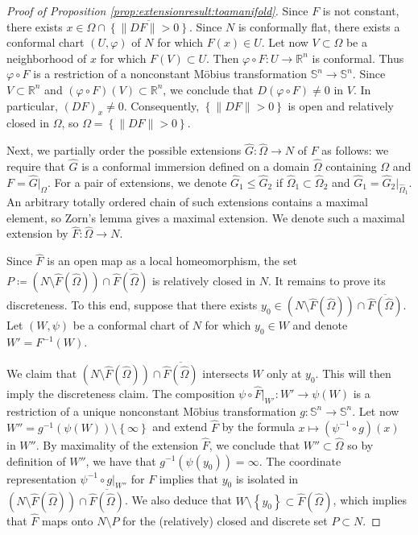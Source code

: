 \documentclass[a4paper,leqno,11pt]{amsart}
\numberwithin{equation}{section}
\theoremstyle{remark}
\theoremstyle{remark}
\newcommand{\R}{\mathbb{R}}
\newcommand{\bS}{\mathbb{S}}
\begin{document}
\begin{proof}[Proof of Proposition \ref{prop:extensionresult:toamanifold}]
Since $F$ is not constant, there exists $x \in \Omega \cap \overline{ \left\{ \|DF\| > 0 \right\} }$. Since $N$ is conformally flat, there exists a conformal chart $(U,\varphi)$ of $N$ for which $F(x)\in U$. Let now $V\subset \Omega$ be a neighborhood of $x$ for which $F(V) \subset U$. Then $\varphi \circ F \colon U \to \R^n$ is conformal. Thus $\varphi \circ F$ is a restriction of a nonconstant M\"obius transformation $\bS^n \to \bS^n$. Since $V \subset \R^n$ and $(\varphi \circ F)(V) \subset \R^n$, we conclude that $D(\varphi \circ F) \ne 0$ in $V$. In particular, $( DF )_x\ne 0$. Consequently, $\left\{ \|DF\| > 0 \right\}$ is open and relatively closed in $\Omega$, so $\Omega = \left\{ \|DF\| > 0 \right\}$.

Next, we partially order the possible extensions $\widehat{G} \colon \widehat{\Omega} \to N$ of $F$ as follows: we require that $\widehat{G}$ is a conformal immersion defined on a domain $\widehat{\Omega}$ containing $\Omega$ and $F= \widehat{G}|_{\Omega}$. For a pair of extensions, we denote $\widehat{G}_1 \leq \widehat{G}_2$ if $\widehat{\Omega}_1 \subset \widehat{\Omega}_2$ and $\widehat{G}_1 = \widehat{G}_2|_{ \widehat{\Omega}_1 }$. An arbitrary totally ordered chain of such extensions contains a maximal element, so Zorn's lemma gives a maximal extension. We denote such a maximal extension by $\widehat{F} \colon \widehat{\Omega} \to N$.

Since $\widehat{F}$ is an open map as a local homeomorphism, the set $P \coloneqq (N\setminus \widehat{F}( \widehat{\Omega}) ) \cap \overline{ \widehat{F}( \widehat{\Omega} ) }$ is relatively closed in $N$. It remains to prove its discreteness. To this end, suppose that there exists $y_0 \in (N\setminus \widehat{F}( \widehat{\Omega}) ) \cap \overline{ \widehat{F}( \widehat{\Omega} ) }$. Let $(W,\psi)$ be a conformal chart of $N$ for which $y_0 \in W$ and denote $W' = F^{-1}( W )$.

We claim that $(N\setminus \widehat{F}( \widehat{\Omega}) ) \cap \overline{ \widehat{F}( \widehat{\Omega} ) }$ intersects $W$ only at $y_0$. This will then imply the discreteness claim. The composition $\psi \circ \widehat{F}|_{W'} \colon W' \to \psi (W)$ is a restriction of a unique nonconstant M\"obius transformation $g\colon \bS^n \to \bS^n$. Let now $W'' = g^{-1}\left( \psi(W) \right) \setminus \left\{ \infty \right\}$ and extend $\widehat{F}$ by the formula $x\mapsto (\psi^{-1} \circ g)(x)$ in $W''$. By maximality of the extension $\widehat{F}$, we conclude that $W'' \subset \widehat{\Omega}$ so by definition of $W''$, we have that $g^{-1}( \psi(y_0) ) = \infty$. The coordinate representation $\psi^{-1} \circ g|_{ W''}$ for $F$ implies that $y_0$ is isolated in $(N\setminus \widehat{F}( \widehat{\Omega}) ) \cap \overline{ \widehat{F}( \widehat{\Omega} ) }$. We also deduce that $W \setminus \left\{y_0\right\} \subset \widehat{F}( \widehat{\Omega} )$, which implies that $\widehat{F}$ maps onto $N \setminus P$ for the (relatively) closed and discrete set $P \subset N$.
\end{proof}
\end{document}
